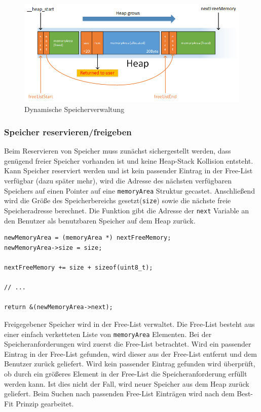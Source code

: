 \documentclass[fontsize=12pt, toc=bibliography, notitlepage]{scrreprt}
\begin{document}
\begin{figure}[H]
	\centering
	\includegraphics[width=450px]{images/memory.png}
	\caption{Dynamische Speicherverwaltung}
	\label{fig:memory}
\end{figure}

\subsubsection{Speicher reservieren/freigeben}
Beim Reservieren von Speicher muss zunächst sichergestellt werden, dass genügend freier Speicher vorhanden ist und keine Heap-Stack Kollision entsteht. Kann Speicher reserviert werden und ist kein passender Eintrag in der Free-List verfügbar (dazu später mehr), wird die Adresse des nächsten verfügbaren Speichers auf einen Pointer auf eine \lstinline$memoryArea$ Struktur gecastet. Anschließend wird die Größe des Speicherbereichs gesetzt(\lstinline$size$)  sowie die nächste freie Speicheradresse berechnet. Die Funktion gibt die Adresse der \lstinline$next$ Variable an den Benutzer als benutzbaren Speicher auf dem Heap zurück.

\begin{lstlisting}[title=memory.c]
newMemoryArea = (memoryArea *) nextFreeMemory;
newMemoryArea->size = size;

nextFreeMemory += size + sizeof(uint8_t);

// ...

return &(newMemoryArea->next);
\end{lstlisting}

Freigegebener Speicher wird in der Free-List verwaltet. Die Free-List besteht aus einer einfach verketteten Liste von \lstinline$memoryArea$ Elementen. Bei der Speicheranforderungen wird zuerst die Free-List betrachtet. Wird ein passender Eintrag in der Free-List gefunden, wird dieser aus der Free-List entfernt und dem Benutzer zurück geliefert. Wird kein passender Eintrag gefunden wird überprüft, ob durch ein größeres Element in der Free-List die Speicheranforderung erfüllt werden kann. Ist dies nicht der Fall, wird neuer Speicher aus dem Heap zurück geliefert. Beim Suchen nach passenden Free-List Einträgen wird nach dem Best-Fit Prinzip gearbeitet.\\
\end{document}
